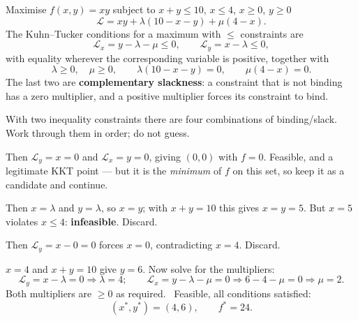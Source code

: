 \begin{worked}{Maximise $f(x,y)=xy$ subject to $x+y\le10$, $x\le4$, $x\ge0$, $y\ge0$}
\[
  \mathcal L=xy+\lambda(10-x-y)+\mu(4-x) .
\]
The Kuhn--Tucker conditions for a maximum with $\le$ constraints are
\[
  \mathcal L_{x}=y-\lambda-\mu\le0,
  \qquad
  \mathcal L_{y}=x-\lambda\le0,
\]
with equality wherever the corresponding variable is positive, together with
\[
  \lambda\ge0,\quad \mu\ge0,
  \qquad
  \lambda(10-x-y)=0,
  \qquad
  \mu(4-x)=0 .
\]
The last two are \textbf{complementary slackness}: a constraint that is not
binding has a zero multiplier, and a positive multiplier forces its
constraint to bind.

With two inequality constraints there are four combinations of
binding/slack. Work through them in order; do not guess.

Then $\mathcal L_{y}=x=0$ and $\mathcal L_{x}=y=0$, giving $(0,0)$ with
$f=0$. Feasible, and a legitimate KKT point --- but it is the \emph{minimum}
of $f$ on this set, so keep it as a candidate and continue.

Then $x=\lambda$ and $y=\lambda$, so $x=y$; with $x+y=10$ this gives
$x=y=5$. But $x=5$ violates $x\le4$: \textbf{infeasible}. Discard.

Then $\mathcal L_{y}=x-0=0$ forces $x=0$, contradicting $x=4$. Discard.

$x=4$ and $x+y=10$ give $y=6$. Now solve for the multipliers:
\[
  \mathcal L_{y}=x-\lambda=0\Rightarrow\lambda=4 ;
  \qquad
  \mathcal L_{x}=y-\lambda-\mu=0\Rightarrow 6-4-\mu=0\Rightarrow\mu=2 .
\]
Both multipliers are $\ge0$ as required. \checkmark\ Feasible, all
conditions satisfied:
\[
  \boxed{(x^{*},y^{*})=(4,6),\qquad f^{*}=24 .}
\]


\end{worked}

